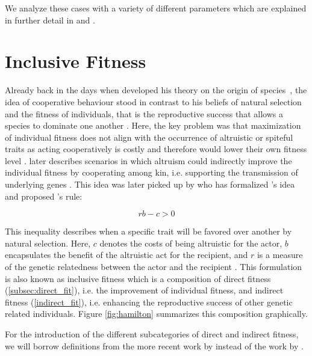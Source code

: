 \documentclass[sigconf]{acmart}
\newcommand{\todo}[1]{{\color{red}{#1}}}
\begin{document}
    We analyze these cases with a variety of different parameters which are explained in further detail in  and .

    \todo{Mention central results and key insight briefly.}


    \section{Inclusive Fitness}\label{sec:inclusive-fitness}

    Already back in the days when \citeauthor{darwin_origin_1859} developed his theory on the origin of species~\cite{darwin_origin_1859}, the idea of cooperative behaviour stood in contrast to his beliefs of natural selection and the fitness of individuals, that is the reproductive success that allows a species to dominate one another \cite{pennisi_how_2005}.
    Here, the key problem was that maximization of individual fitness does not align with the occurrence of altruistic or spiteful traits as acting cooperatively is costly and therefore would lower their own fitness level \cite{west_altruism_2010}.
    \citeauthor{darwin_origin_1859} later describes scenarios in which altruism could indirectly improve the individual fitness by cooperating among kin, i.e. supporting the transmission of underlying genes \cite{pennisi_how_2005,gardner_theory_2009}.
    This idea was later picked up by \citeauthor{hamilton_kin_1964} who has formalized \citeauthor{darwin_origin_1859}'s idea and proposed \citeauthor{hamilton_kin_1964}'s rule:

    $$rb-c>0$$

    This inequality describes when a specific trait will be favored over another by natural selection.
    Here, $c$ denotes the costs of being altruistic for the actor, $b$ encapsulates the benefit of the altruistic act for the recipient, and $r$ is a measure of the genetic relatedness between the actor and the recipient \cite{west_altruism_2010}.
    This formulation is also known as inclusive fitness which is a composition of direct fitness (\ref{subsec:direct_fit}), i.e. the improvement of individual fitness, and indirect fitness (\ref{indirect_fit}), i.e. enhancing the reproductive success of other genetic related individuals.
    Figure \ref{fig:hamilton} summarizes this composition graphically.

    For the introduction of the different subcategories of direct and indirect fitness, we will borrow definitions from the more recent work by \citeauthor{west_altruism_2010} \cite{west_altruism_2010} instead of the work by \citeauthor{gardner_theory_2009} \cite{gardner_theory_2009}.
\end{document}
